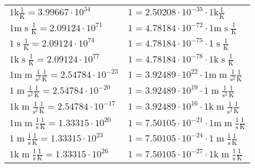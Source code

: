 \begin{center}
\begin{longtable}{l l}
{\color{gray}$1 \bm{\mathrm{ k}}{}{}{}\frac1{\operatorname{K}} = 3.99667\cdot10^{34} $}   & {\color{gray}$ 1 = 2.50208\cdot10^{-35} \cdot 1 \bm{\mathrm{ k}}{}{}{}\frac1{\operatorname{K}}$}  \\
{\color{gray}$1 \bm{\mathrm{ m}}{}{\operatorname{s}}{}\frac1{\operatorname{K}} = 2.09124\cdot10^{71} $}   & {\color{gray}$ 1 = 4.78184\cdot10^{-72} \cdot 1 \bm{\mathrm{ m}}{}{\operatorname{s}}{}\frac1{\operatorname{K}}$}  \\
{\color{black}$1 \bm{\mathrm{ }}{}{\operatorname{s}}{}\frac1{\operatorname{K}} = 2.09124\cdot10^{74} $}   & {\color{black}$ 1 = 4.78184\cdot10^{-75} \cdot 1 \bm{\mathrm{ }}{}{\operatorname{s}}{}\frac1{\operatorname{K}}$}  \\
{\color{gray}$1 \bm{\mathrm{ k}}{}{\operatorname{s}}{}\frac1{\operatorname{K}} = 2.09124\cdot10^{77} $}   & {\color{gray}$ 1 = 4.78184\cdot10^{-78} \cdot 1 \bm{\mathrm{ k}}{}{\operatorname{s}}{}\frac1{\operatorname{K}}$}  \\
{\color{gray}$1 \bm{\mathrm{ m}}{\operatorname{m}}\frac1{\operatorname{s}^2}{}\frac1{\operatorname{K}} = 2.54784\cdot10^{-23} $}   & {\color{gray}$ 1 = 3.92489\cdot10^{22} \cdot 1 \bm{\mathrm{ m}}{\operatorname{m}}\frac1{\operatorname{s}^2}{}\frac1{\operatorname{K}}$}  \\
{\color{black}$1 \bm{\mathrm{ }}{\operatorname{m}}\frac1{\operatorname{s}^2}{}\frac1{\operatorname{K}} = 2.54784\cdot10^{-20} $}   & {\color{black}$ 1 = 3.92489\cdot10^{19} \cdot 1 \bm{\mathrm{ }}{\operatorname{m}}\frac1{\operatorname{s}^2}{}\frac1{\operatorname{K}}$}  \\
{\color{gray}$1 \bm{\mathrm{ k}}{\operatorname{m}}\frac1{\operatorname{s}^2}{}\frac1{\operatorname{K}} = 2.54784\cdot10^{-17} $}   & {\color{gray}$ 1 = 3.92489\cdot10^{16} \cdot 1 \bm{\mathrm{ k}}{\operatorname{m}}\frac1{\operatorname{s}^2}{}\frac1{\operatorname{K}}$}  \\
{\color{gray}$1 \bm{\mathrm{ m}}{\operatorname{m}}\frac1{\operatorname{s}}{}\frac1{\operatorname{K}} = 1.33315\cdot10^{20} $}   & {\color{gray}$ 1 = 7.50105\cdot10^{-21} \cdot 1 \bm{\mathrm{ m}}{\operatorname{m}}\frac1{\operatorname{s}}{}\frac1{\operatorname{K}}$}  \\
{\color{black}$1 \bm{\mathrm{ }}{\operatorname{m}}\frac1{\operatorname{s}}{}\frac1{\operatorname{K}} = 1.33315\cdot10^{23} $}   & {\color{black}$ 1 = 7.50105\cdot10^{-24} \cdot 1 \bm{\mathrm{ }}{\operatorname{m}}\frac1{\operatorname{s}}{}\frac1{\operatorname{K}}$}  \\
{\color{gray}$1 \bm{\mathrm{ k}}{\operatorname{m}}\frac1{\operatorname{s}}{}\frac1{\operatorname{K}} = 1.33315\cdot10^{26} $}   & {\color{gray}$ 1 = 7.50105\cdot10^{-27} \cdot 1 \bm{\mathrm{ k}}{\operatorname{m}}\frac1{\operatorname{s}}{}\frac1{\operatorname{K}}$}  \\

\end{longtable}
\end{center}
